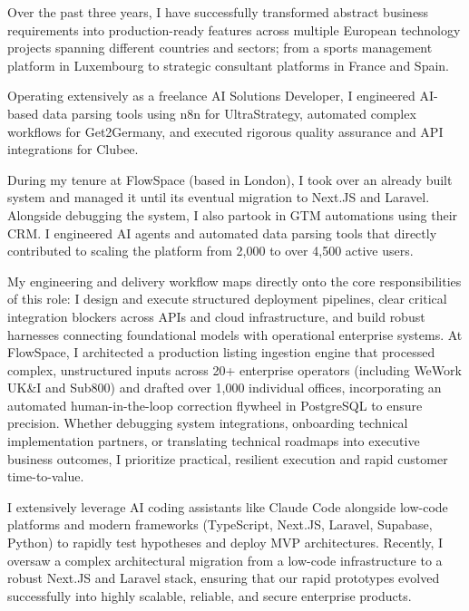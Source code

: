 \documentclass[10pt,a4paper]{article}
\begin{document}
\vspace{6pt}
Over the past three years, I have successfully transformed abstract business requirements into production-ready features across multiple European technology projects spanning different countries and sectors; from a sports management platform in Luxembourg to strategic consultant platforms in France and Spain.

\vspace{6pt}
Operating extensively as a freelance AI Solutions Developer, I engineered AI-based data parsing tools using n8n for UltraStrategy, automated complex workflows for Get2Germany, and executed rigorous quality assurance and API integrations for Clubee.

\vspace{6pt}
During my tenure at FlowSpace (based in London), I took over an already built system and managed it until its eventual migration to Next.JS and Laravel. Alongside debugging the system, I also partook in GTM automations using their CRM. I engineered AI agents and automated data parsing tools that directly contributed to scaling the platform from 2,000 to over 4,500 active users.

\vspace{6pt}
My engineering and delivery workflow maps directly onto the core responsibilities of this role: I design and execute structured deployment pipelines, clear critical integration blockers across APIs and cloud infrastructure, and build robust harnesses connecting foundational models with operational enterprise systems. At FlowSpace, I architected a production listing ingestion engine that processed complex, unstructured inputs across 20+ enterprise operators (including WeWork UK\&I and Sub800) and drafted over 1,000 individual offices, incorporating an automated human-in-the-loop correction flywheel in PostgreSQL to ensure precision. Whether debugging system integrations, onboarding technical implementation partners, or translating technical roadmaps into executive business outcomes, I prioritize practical, resilient execution and rapid customer time-to-value.

\vspace{6pt}
I extensively leverage AI coding assistants like Claude Code alongside low-code platforms and modern frameworks (TypeScript, Next.JS, Laravel, Supabase, Python) to rapidly test hypotheses and deploy MVP architectures. Recently, I oversaw a complex architectural migration from a low-code infrastructure to a robust Next.JS and Laravel stack, ensuring that our rapid prototypes evolved successfully into highly scalable, reliable, and secure enterprise products.
\end{document}
